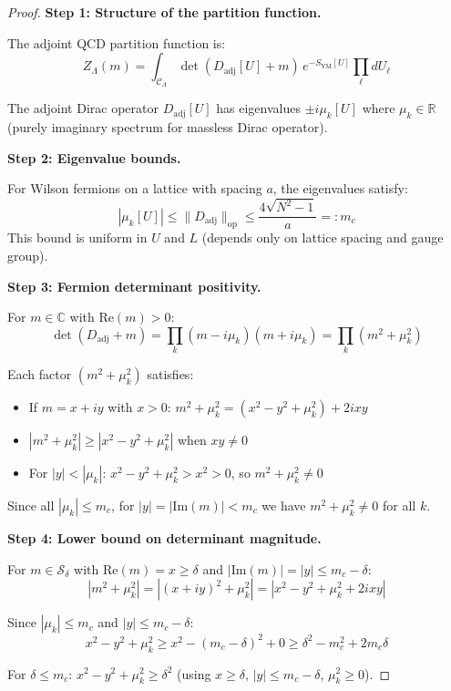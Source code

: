 \begin{proof}
\textbf{Step 1: Structure of the partition function.}

The adjoint QCD partition function is:
\[
Z_\Lambda(m) = \int_{\mathcal{C}_\Lambda} \det(D_{\mathrm{adj}}[U] + m) \, e^{-S_{\mathrm{YM}}[U]} \prod_\ell dU_\ell
\]

The adjoint Dirac operator $D_{\mathrm{adj}}[U]$ has eigenvalues $\pm i\mu_k[U]$ 
where $\mu_k \in \mathbb{R}$ (purely imaginary spectrum for massless Dirac operator).

\textbf{Step 2: Eigenvalue bounds.}

For Wilson fermions on a lattice with spacing $a$, the eigenvalues satisfy:
\[
|\mu_k[U]| \leq \|D_{\mathrm{adj}}\|_{\mathrm{op}} \leq \frac{4\sqrt{N^2-1}}{a} =: m_c
\]
This bound is uniform in $U$ and $L$ (depends only on lattice spacing and gauge group).

\textbf{Step 3: Fermion determinant positivity.}

For $m \in \mathbb{C}$ with $\mathrm{Re}(m) > 0$:
\[
\det(D_{\mathrm{adj}} + m) = \prod_k (m - i\mu_k)(m + i\mu_k) = \prod_k (m^2 + \mu_k^2)
\]

Each factor $(m^2 + \mu_k^2)$ satisfies:
\begin{itemize}
\item If $m = x + iy$ with $x > 0$: $m^2 + \mu_k^2 = (x^2 - y^2 + \mu_k^2) + 2ixy$
\item $|m^2 + \mu_k^2| \geq |x^2 - y^2 + \mu_k^2|$ when $xy \neq 0$
\item For $|y| < |\mu_k|$: $x^2 - y^2 + \mu_k^2 > x^2 > 0$, so $m^2 + \mu_k^2 \neq 0$
\end{itemize}

Since all $|\mu_k| \leq m_c$, for $|y| = |\mathrm{Im}(m)| < m_c$ we have 
$m^2 + \mu_k^2 \neq 0$ for all $k$.

\textbf{Step 4: Lower bound on determinant magnitude.}

For $m \in \mathcal{S}_\delta$ with $\mathrm{Re}(m) = x \geq \delta$ and $|\mathrm{Im}(m)| = |y| \leq m_c - \delta$:
\[
|m^2 + \mu_k^2| = |(x + iy)^2 + \mu_k^2| = |x^2 - y^2 + \mu_k^2 + 2ixy|
\]

Since $|\mu_k| \leq m_c$ and $|y| \leq m_c - \delta$:
\[
x^2 - y^2 + \mu_k^2 \geq x^2 - (m_c - \delta)^2 + 0 \geq \delta^2 - m_c^2 + 2m_c\delta
\]

For $\delta \leq m_c$: $x^2 - y^2 + \mu_k^2 \geq \delta^2$ (using $x \geq \delta$, $|y| \leq m_c - \delta$, $\mu_k^2 \geq 0$).


\end{proof}
